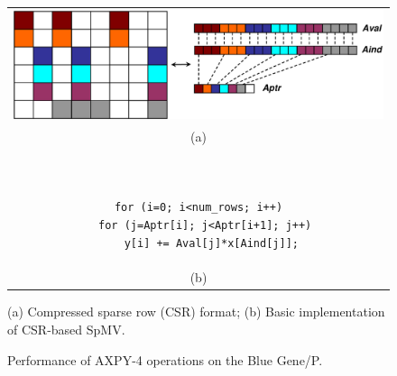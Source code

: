 \begin{figure}%
\begin{tabular}{c}
\begin{minipage}[t]{.47\textwidth}
\centering
\vspace{0.2in}
\includegraphics[width=1.0\textwidth]{figures/spmv.eps}  
\end{minipage}
\\
{\footnotesize (a)}
\\
\begin{minipage}[t]{.3\textwidth}
\scriptsize
\begin{verbatim}


for (i=0; i<num_rows; i++)
  for (j=Aptr[i]; j<Aptr[i+1]; j++)
    y[i] += Aval[j]*x[Aind[j]];

\end{verbatim}
\end{minipage}
\\
{\footnotesize (b)}
\\
\end{tabular}

\caption{(a) Compressed sparse row (CSR) format; (b) Basic implementation of CSR-based SpMV.}
\label{fig:spmv}
\end{figure}


\begin{figure}%
\begin{center} 
\end{center}
\caption{Performance of AXPY-4 operations on the Blue Gene/P.} 
\label{fig:axpy4-bgp-results} 
\end{figure} 




